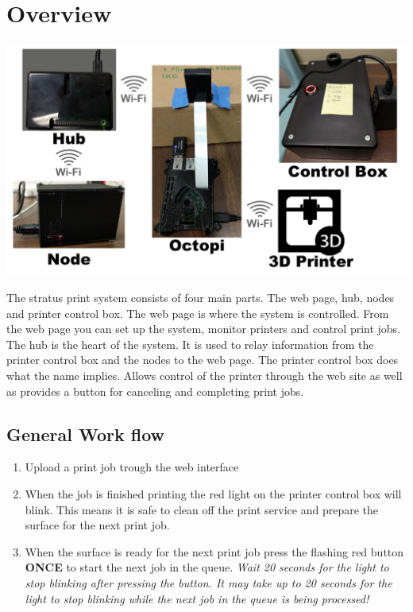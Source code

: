 


  

  \pagecolor{white}

  \tableofcontents

  \newpage

  \section{Overview}
  \begin{center}
   	\includegraphics[scale=0.25]{images/flow.png}
  \end{center}
  The stratus print system consists of four main parts. The web page, hub, nodes and printer
  control box. The web page is where the system is controlled. From the web page you can set up
  the system, monitor printers and control print jobs. The hub is the heart of the system. It is
  used to relay information from the printer control box and the nodes to the web page. The printer
  control box does what the name implies. Allows control of the printer through the web site as well
  as provides a button for canceling and completing print jobs.

  \subsection{General Work flow}
    \begin{enumerate}
      \item Upload a print job trough the web interface
      \item When the job is finished printing the red light on the printer control box
      will blink. This means it is safe to clean off the print service and prepare the
      surface for the next print job.
      \item When the surface is ready for the next print job press the flashing red button \textbf{ONCE} to start the next job in the queue.  \emph{Wait 20 seconds for the light to stop blinking after pressing the button.  It may take up to 20 seconds for the light to stop blinking while the next job in the queue is being processed!} 
    \end{enumerate}
  \newpage
  

  \newpage
  

  \newpage
  

  \newpage
  

  
